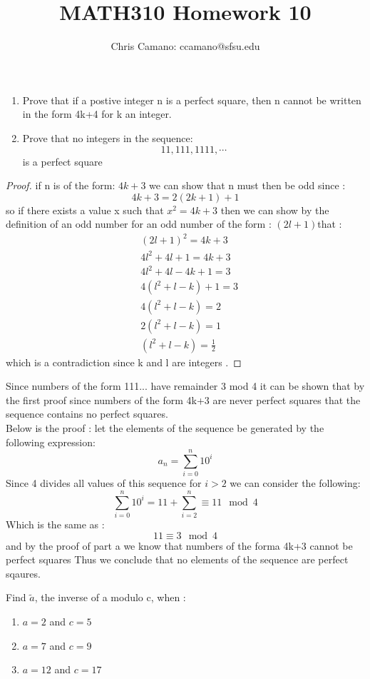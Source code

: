 \documentclass[11pt]{article}
\author{Chris Camano: ccamano@sfsu.edu}
\title{MATH310  Homework 10 }
\date
\theoremstyle{definition}  %
\newcommand{\block}[2]{\begin{tcolorbox}[title={#1}]{#2}\end{tcolorbox}}
\begin{document}
\maketitle
\block{Stein 1.13}{
\begin{enumerate}
  \item Prove that if a postive integer n is a perfect square, then n cannot be written in the form 4k+4 for k an integer.
  \item Prove that no integers in the sequence:
  \[
    11,111,1111,\cdots
  \]
  is a perfect square
\end{enumerate}
}
\begin{proof}
if n is of the form: $4k+3$ we can show that n must then be odd since :
\[
  4k+3=2(2k+1)+1
\]
so if there exists a value x such that $x^2=4k+3$ then we can show by the definition of an odd number for an odd number of the form : $(2l+1)$that :
\begin{align*}
  &(2l+1)^2=4k+3\\
  &4l^2+4l+1=4k+3\\
  &4l^2+4l-4k+1=3\\
  &4(l^2+l-k)+1=3\\
  &4(l^2+l-k)=2\\
  &2(l^2+l-k)=1\\
  &(l^2+l-k)=\frac{1}{2}
\end{align*}
which is a contradiction since k and l are integers .
\end{proof}
\begin{proof }
  Since numbers of the form 111... have remainder 3 mod 4 it can be shown that by the first proof since numbers of the form 4k+3 are never perfect squares that the sequence contains no perfect squares. \\
  Below is the proof :
let the elements of the sequence be generated by the following expression:
\[
  a_n=\sum_{i=0}^n10^i
\]
Since 4 divides all values of this sequence for $i>2$ we can consider the following:
\[
  \sum_{i=0}^n10^i=11+\sum_{i=2}^n\equiv 11\mod 4
\]
Which is the same as :
\[
  11\equiv 3 \mod 4
\]
and by the proof of part a we know that numbers of the forma 4k+3 cannot be perfect squares Thus we conclude that no elements of the sequence are perfect sqaures.
\end{proof }
\block{Andrews 5.1.3}{
Find $\tilde{a}$, the inverse of a modulo c, when :
\begin{enumerate}
  \item $a=2$ and $c=5$\\
  \item $a=7$ and $c=9$\\
  \item $a=12$ and $c=17$\\
\end{enumerate}
}
\end{document}
